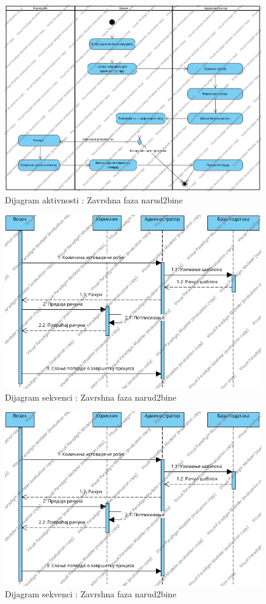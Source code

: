 \begin{figure}[h!]
	\includegraphics[scale=0.4]{Slike/SUzavrsnaFazaPorudzbineActivity Diagram.jpg}
	\centering
	\caption{Dijagram aktivnosti : Zavrshna faza narud2bine}
	\label{ucZavrsnaFazaAktivnost}
\end{figure}
\begin{figure}[h!]
	\includegraphics[scale=0.4]{Slike/SUzavrsnaFazaProudzbineSequence Diagram1.jpg}
	\centering
	\caption{Dijagram sekvenci : Zavrshna faza narud2bine}
	\label{ucZavrsnaFazaSekvence}
\end{figure}
\begin{figure}[h!]
	\includegraphics[scale=0.4]{Slike/SUzavrsnaFazaProudzbineSequence Diagram1.jpg}
	\centering
	\caption{Dijagram sekvenci : Zavrshna faza narud2bine}
	\label{ucZavrsnaFazaSekvence}
\end{figure}
